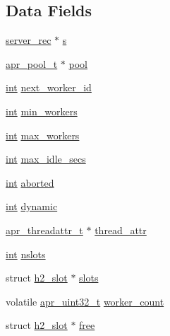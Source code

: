 \subsection*{Data Fields}
\begin{DoxyCompactItemize}
\item 
\hyperlink{structserver__rec}{server\+\_\+rec} $\ast$ \hyperlink{structh2__workers_a5cdc76df2d91977b6596471c5bf89ab1}{s}
\item 
\hyperlink{structapr__pool__t}{apr\+\_\+pool\+\_\+t} $\ast$ \hyperlink{structh2__workers_a4a6f1316a0a960a41c4acaae4fe3d1f6}{pool}
\item 
\hyperlink{pcre_8txt_a42dfa4ff673c82d8efe7144098fbc198}{int} \hyperlink{structh2__workers_a669de787f360b8b5c1575ee4d2cb3321}{next\+\_\+worker\+\_\+id}
\item 
\hyperlink{pcre_8txt_a42dfa4ff673c82d8efe7144098fbc198}{int} \hyperlink{structh2__workers_a2f9146472357988e152728e2f75aebdf}{min\+\_\+workers}
\item 
\hyperlink{pcre_8txt_a42dfa4ff673c82d8efe7144098fbc198}{int} \hyperlink{structh2__workers_aadaf15dfdd211a908c16876dbe624f83}{max\+\_\+workers}
\item 
\hyperlink{pcre_8txt_a42dfa4ff673c82d8efe7144098fbc198}{int} \hyperlink{structh2__workers_a124da2075be6c3670fc873ba12c2395a}{max\+\_\+idle\+\_\+secs}
\item 
\hyperlink{pcre_8txt_a42dfa4ff673c82d8efe7144098fbc198}{int} \hyperlink{structh2__workers_a48a7643eac9625106ea9b3cd60e39bab}{aborted}
\item 
\hyperlink{pcre_8txt_a42dfa4ff673c82d8efe7144098fbc198}{int} \hyperlink{structh2__workers_a00d0f096c6b8b1946852a34c202253cb}{dynamic}
\item 
\hyperlink{structapr__threadattr__t}{apr\+\_\+threadattr\+\_\+t} $\ast$ \hyperlink{structh2__workers_a8fc62165a55dd338d37bd24778e96f1f}{thread\+\_\+attr}
\item 
\hyperlink{pcre_8txt_a42dfa4ff673c82d8efe7144098fbc198}{int} \hyperlink{structh2__workers_a5aeca2bf5d96ce8e570c4f24277f39f6}{nslots}
\item 
struct \hyperlink{structh2__slot}{h2\+\_\+slot} $\ast$ \hyperlink{structh2__workers_a0864d31736bec5780751ec52a6f5798b}{slots}
\item 
volatile \hyperlink{group__apr__platform_ga558548a135d8a816c4787250744ea147}{apr\+\_\+uint32\+\_\+t} \hyperlink{structh2__workers_a9f9fcece7bbf08f65ab1aac955310d75}{worker\+\_\+count}
\item 
struct \hyperlink{structh2__slot}{h2\+\_\+slot} $\ast$ \hyperlink{structh2__workers_ae9f9de2d0be6f92c6a5e54056800f2e9}{free}

\end{DoxyCompactItemize}
